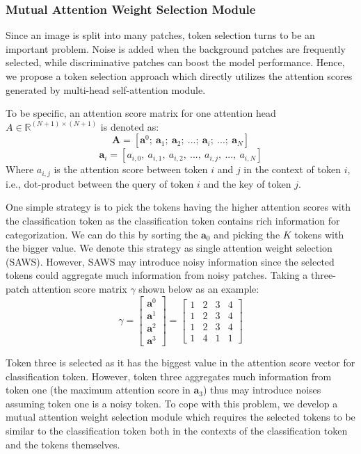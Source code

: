 \documentclass{bmvc2k}
\begin{document}
\subsubsection{Mutual Attention Weight Selection Module}
Since an image is split into many patches, token selection turns to be an important problem. Noise is added when the background patches are frequently selected, while discriminative patches can boost the model performance. Hence, we propose a token selection approach which directly utilizes the attention scores generated by multi-head self-attention module.
\par
To be specific, an attention score matrix for one attention head $A \in \mathbb{R}^{(N+1)\times (N+1)}$ is denoted as:
\begin{equation}
 \bm{A}=[\bm{a}^0;\  \bm{a}_1;\  \bm{a}_2;\ ...;\ \bm{a}_{i};\ ...;\ \bm{a}_{N}]
\end{equation}
\begin{equation}
 \bm{a}_i=[a_{i,0},\ a_{i,1},\ a_{i,2}, \ ...,\ a_{i,j},\ ...,\  a_{i,N} ]
\end{equation}
Where $a_{i,j}$ is the attention score between token $i$ and $j$ in the context of token $i$, i.e., dot-product between the query of token $i$ and the key of token $j$.
\par
One simple strategy is to pick the tokens having the higher attention scores with the classification token as the classification token contains rich information for categorization. We can do this by sorting the $\bm{a}_0$ and picking the $K$ tokens with the bigger value. We denote this strategy as single attention weight selection (SAWS). However, SAWS may introduce noisy information since the selected tokens could aggregate much information from noisy patches. Taking a three-patch attention score matrix $\gamma$ shown below as an example:
$$
\gamma=
\left[
\begin{matrix}
   \bm{a}^0  \\
   \bm{a}^1 \\
   \bm{a}^2  \\
   \bm{a}^3 
   \end{matrix}
   \right]
=
\left[
\begin{matrix}
   1 & 2 & 3 & 4 \\
   1 & 2 & 3 & 4 \\
   1 & 2 & 3 & 4 \\
   1 & 4 & 1 & 1
   \end{matrix}
   \right]
$$
\par
Token three is selected as it has the biggest value in the attention score vector for classification token. However, token three aggregates much information from token one (the maximum attention score in $\bm{a}_3$) thus may introduce noises assuming token one is a noisy token. To cope with this problem, we develop a mutual attention weight selection module which requires the selected tokens to be similar to the classification token both in the contexts of the classification token and the tokens themselves.
\end{document}
